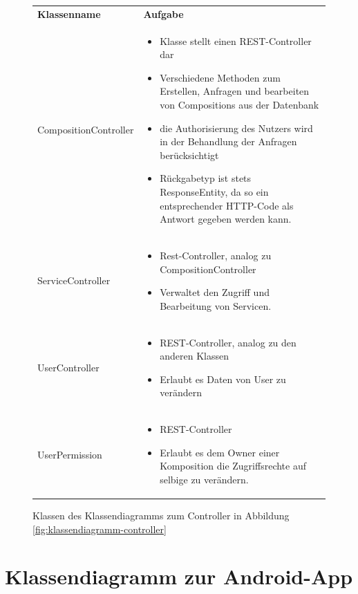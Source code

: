 \begin{figure}[h]
	\begin{tabularx}{\textwidth}{p{} | X}
		\rowcolor[HTML]{C0C0C0}
		\textbf{Klassenname} & \textbf{Aufgabe} \\
		CompositionController & \compress \begin{itemize}
		\item Klasse stellt einen REST-Controller dar
		\item Verschiedene Methoden zum Erstellen, Anfragen und bearbeiten von Compositions aus der Datenbank
		\item die Authorisierung des Nutzers wird in der Behandlung der Anfragen berücksichtigt
		\item Rückgabetyp ist stets ResponseEntity, da so ein entsprechender HTTP-Code als Antwort gegeben werden kann.
		\end{itemize}\\
		\rowcolor[HTML]{E7E7E7}
		ServiceController & \compress  \begin{itemize}
			\item Rest-Controller, analog zu CompositionController
			\item Verwaltet den Zugriff und Bearbeitung von Servicen.
		\end{itemize}\\
		UserController & \compress  \begin{itemize}
			\item REST-Controller, analog zu den anderen Klassen
			\item Erlaubt es Daten von User zu verändern
		\end{itemize}\\
		\rowcolor[HTML]{E7E7E7}
		UserPermission & \compress  \begin{itemize}
			\item REST-Controller
			\item Erlaubt es dem Owner einer Komposition die Zugriffsrechte auf selbige zu verändern.
		\end{itemize}
	\end{tabularx}
	\caption{Klassen des Klassendiagramms zum Controller in Abbildung \ref{fig:klassendiagramm-controller}}
\end{figure}

\newpage
\section*{Klassendiagramm zur Android-App}

